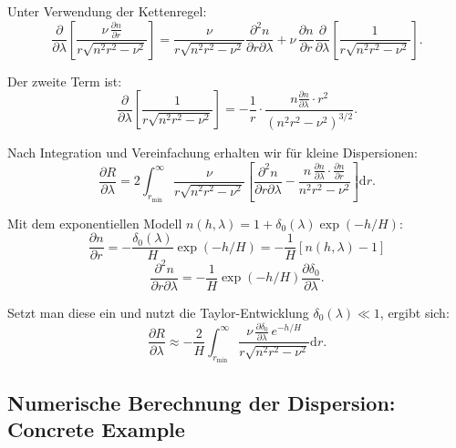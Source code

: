 \documentclass[12pt,a4paper]{article}
\begin{document}
Unter Verwendung der Kettenregel:
\begin{equation}
	\frac{\partial}{\partial \lambda}\left[\frac{\nu \, \frac{\partial n}{\partial r}}{r \sqrt{n^2 r^2 - \nu^2}}\right] 
	= \frac{\nu}{r \sqrt{n^2 r^2 - \nu^2}} \frac{\partial^2 n}{\partial r \partial \lambda}
	+ \nu \, \frac{\partial n}{\partial r} \frac{\partial}{\partial \lambda}\left[\frac{1}{r\sqrt{n^2 r^2 - \nu^2}}\right].
	\label{eq:kettenregel_detail}
\end{equation}

Der zweite Term ist:
\begin{equation}
	\frac{\partial}{\partial \lambda}\left[\frac{1}{r\sqrt{n^2 r^2 - \nu^2}}\right] 
	= -\frac{1}{r} \cdot \frac{n \frac{\partial n}{\partial \lambda} \cdot r^2}{(n^2 r^2 - \nu^2)^{3/2}}.
	\label{eq:zweiter_term}
\end{equation}

Nach Integration und Vereinfachung erhalten wir für kleine Dispersionen:
\begin{equation}
	\frac{\partial R}{\partial \lambda} = 2 \int_{r_{\min}}^{\infty} 
	\frac{\nu}{r \sqrt{n^2 r^2 - \nu^2}} \left[\frac{\partial^2 n}{\partial r \partial \lambda} 
	- \frac{n \, \frac{\partial n}{\partial \lambda} \cdot \frac{\partial n}{\partial r}}{n^2 r^2 - \nu^2}\right] \mathrm{d}r.
	\label{eq:dR_dlambda_explizit}
\end{equation}

Mit dem exponentiellen Modell $n(h, \lambda) = 1 + \delta_0(\lambda) \exp(-h/H)$:
\begin{equation}
	\frac{\partial n}{\partial r} = -\frac{\delta_0(\lambda)}{H} \exp(-h/H) = -\frac{1}{H}[n(h,\lambda)-1]
\end{equation}
\begin{equation}
	\frac{\partial^2 n}{\partial r \partial \lambda} = -\frac{1}{H} \exp(-h/H) \frac{\partial \delta_0}{\partial \lambda}.
\end{equation}

Setzt man diese ein und nutzt die Taylor-Entwicklung $\delta_0(\lambda) \ll 1$, ergibt sich:
\begin{equation}
	\frac{\partial R}{\partial \lambda} \approx -\frac{2}{H} \int_{r_{\min}}^{\infty}
	\frac{\nu \, \frac{\partial \delta_0}{\partial \lambda} \, e^{-h/H}}{r\sqrt{n^2 r^2 - \nu^2}} \mathrm{d}r.
	\label{eq:dR_dlambda_approx}
\end{equation}

\subsection{Numerische Berechnung der Dispersion: Concrete Example}
\label{subsec:concrete_dispersion}
\end{document}
